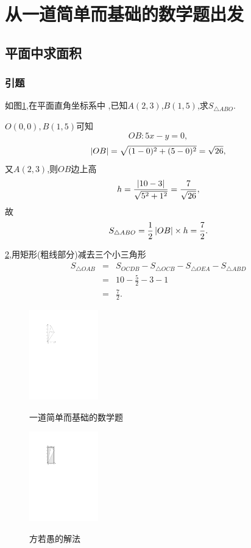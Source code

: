 \section{从一道简单而基础的数学题出发}
\subsection{平面中求面积}
\subsubsection{引题}

  \prob 如图\ref{pro1},在平面直角坐标系中
  ,已知$A(2,3)$,$B(1,5)$,求$S_{\triangle ABO}$.

  $O(0,0),B(1,5)$可知
  $$OB:5x-y=0,$$
  $$\left| {OB} \right|=\sqrt{(1-0)^2+(5-0)^2}=\sqrt{26},$$
  又$A(2,3)$,则$OB$边上高
  $$h=\frac{\left| {10-3} \right|}{\sqrt{5^2+1^2}}=\frac{7}{\sqrt{26}},$$
  故
  $$S_{\triangle ABO}=\frac{1}{2}\left| {OB} \right|\times h=\frac{7}{2}.$$
\solend

\ref{pro2},用矩形(粗线部分)减去三个小三角形
\begin{eqnarray}
S_{\triangle OAB}
&=&S_{OCDB}-S_{\triangle OCB}-
S_{\triangle OEA}-S_{\triangle ABD} \nonumber\\
&=&10-\frac{5}{2}-3-1\nonumber\\
&=&\frac{7}{2}.\nonumber
\end{eqnarray}
\solend

\begin{figure}
  \centering
  \includegraphics[width=3cm]{pic//1//1.pdf}\\
  \caption{一道简单而基础的数学题}\label{pro1}
\end{figure}

\begin{figure}
  \centering
  \includegraphics[width=3cm]{pic//2//2.pdf}\\
  \caption{方若愚的解法}\label{pro2}
\end{figure}

